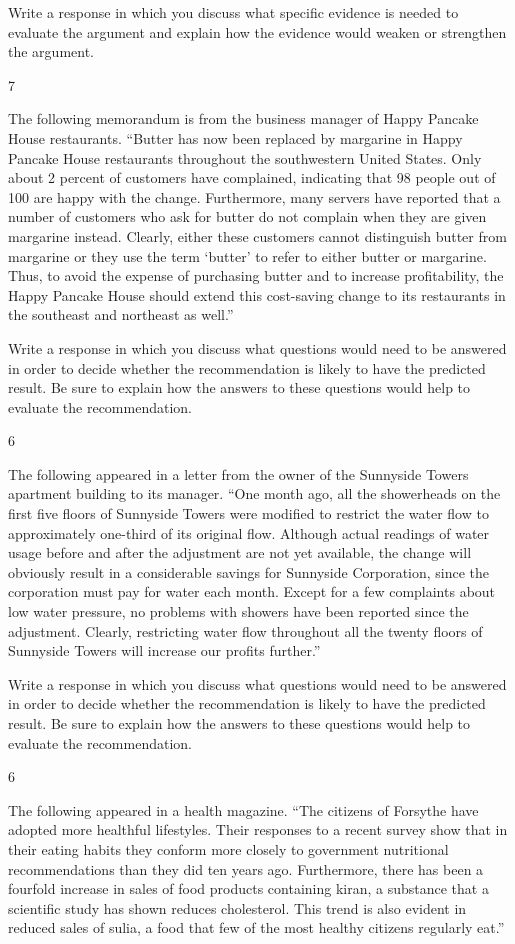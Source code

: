\documentclass[]{article}
\begin{document}
Write a response in which you discuss what specific evidence is needed
to evaluate the argument and explain how the evidence would weaken or
strengthen the argument.

7

The following memorandum is from the business manager of Happy Pancake
House restaurants. ``Butter has now been replaced by margarine in Happy
Pancake House restaurants throughout the southwestern United States.
Only about 2 percent of customers have complained, indicating that 98
people out of 100 are happy with the change. Furthermore, many servers
have reported that a number of customers who ask for butter do not
complain when they are given margarine instead. Clearly, either these
customers cannot distinguish butter from margarine or they use the term
`butter' to refer to either butter or margarine. Thus, to avoid the
expense of purchasing butter and to increase profitability, the Happy
Pancake House should extend this cost-saving change to its restaurants
in the southeast and northeast as well.''

Write a response in which you discuss what questions would need to be
answered in order to decide whether the recommendation is likely to have
the predicted result. Be sure to explain how the answers to these
questions would help to evaluate the recommendation.

6

The following appeared in a letter from the owner of the Sunnyside
Towers apartment building to its manager. ``One month ago, all the
showerheads on the first five floors of Sunnyside Towers were modified
to restrict the water flow to approximately one-third of its original
flow. Although actual readings of water usage before and after the
adjustment are not yet available, the change will obviously result in a
considerable savings for Sunnyside Corporation, since the corporation
must pay for water each month. Except for a few complaints about low
water pressure, no problems with showers have been reported since the
adjustment. Clearly, restricting water flow throughout all the twenty
floors of Sunnyside Towers will increase our profits further.''

Write a response in which you discuss what questions would need to be
answered in order to decide whether the recommendation is likely to have
the predicted result. Be sure to explain how the answers to these
questions would help to evaluate the recommendation.

6

The following appeared in a health magazine. ``The citizens of Forsythe
have adopted more healthful lifestyles. Their responses to a recent
survey show that in their eating habits they conform more closely to
government nutritional recommendations than they did ten years ago.
Furthermore, there has been a fourfold increase in sales of food
products containing kiran, a substance that a scientific study has shown
reduces cholesterol. This trend is also evident in reduced sales of
sulia, a food that few of the most healthy citizens regularly eat.''
\end{document}
